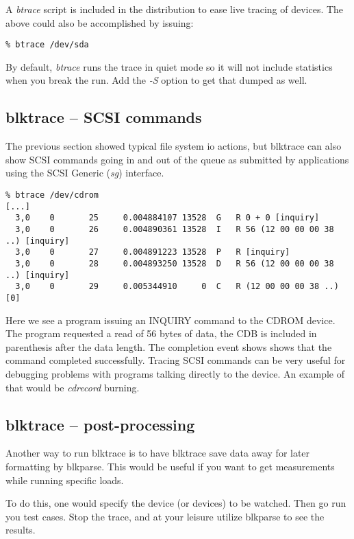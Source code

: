 \documentclass{article}
\begin{document}
A \emph{btrace} script is included in the distribution to ease live
tracing of devices. The above could also be accomplished by issuing:

\begin{verbatim}
% btrace /dev/sda
\end{verbatim}

By default, \emph{btrace} runs the trace in quiet mode so it will not
include statistics when you break the run. Add the \emph{-S} option to
get that dumped as well.

\subsection{\label{sec:pc-blktrace}blktrace -- SCSI commands}

The previous section showed typical file system io actions, but blktrace
can also show SCSI commands going in and out of the queue as submitted
by applications using the SCSI Generic (\emph{sg}) interface.

\begin{verbatim}
% btrace /dev/cdrom
[...]
  3,0    0       25     0.004884107 13528  G   R 0 + 0 [inquiry]
  3,0    0       26     0.004890361 13528  I   R 56 (12 00 00 00 38 ..) [inquiry]
  3,0    0       27     0.004891223 13528  P   R [inquiry]
  3,0    0       28     0.004893250 13528  D   R 56 (12 00 00 00 38 ..) [inquiry]
  3,0    0       29     0.005344910     0  C   R (12 00 00 00 38 ..) [0]
\end{verbatim}

Here we see a program issuing an INQUIRY command to the CDROM device.
The program requested a read of 56 bytes of data, the CDB is included
in parenthesis after the data length. The completion event shows shows
that the command completed successfully. Tracing SCSI commands can be
very useful for debugging problems with programs talking directly to the
device. An example of that would be \emph{cdrecord} burning.

\subsection{\label{sec:blktrace-post}blktrace -- post-processing}

Another way to run blktrace is to have blktrace save data away for later
formatting by blkparse. This would be useful if you want to get 
measurements while running specific loads.

To do this, one would specify the device (or devices) to be watched. Then 
go run you test cases. Stop the trace, and at your leisure utilize
blkparse to see the results.
\end{document}
